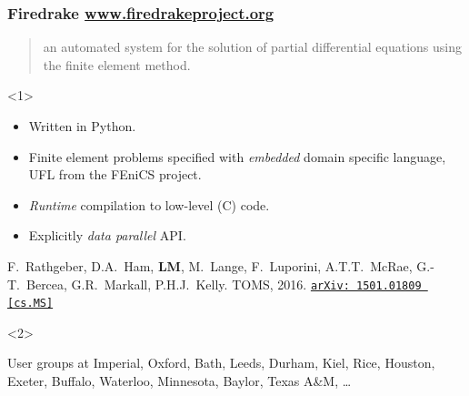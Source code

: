 \documentclass[presentation]{beamer}
\newcommand{\arxivlink}[2]{%
  \href{http://www.arxiv.org/abs/#1}%
  {\texttt{arXiv:\,#1\,[#2]}}%
}
\begin{document}
\begin{frame}
  \frametitle{Firedrake \url{www.firedrakeproject.org}}

  \begin{quote}
    {\normalfont [\ldots]} an automated system for the solution of partial
    differential equations using the finite element method.
  \end{quote}

  \begin{onlyenv}<1>
    \begin{itemize}
    \item Written in Python.
    \item Finite element problems specified with \emph{embedded}
      domain specific language, UFL \parencite{Alnaes:2014} from the
      FEniCS project.
    \item \emph{Runtime} compilation to low-level (C) code.
    \item Explicitly \emph{data parallel} API.
    \end{itemize}

    \begin{flushright}
      {\scriptsize F.~Rathgeber, D.A.~Ham, \textbf{LM}, M.~Lange,
        F.~Luporini, A.T.T.~McRae, G.-T.~Bercea, G.R.~Markall,
        P.H.J.~Kelly. TOMS,
        2016. \arxivlink{1501.01809}{cs.MS}\nocite{Rathgeber:2016}}
    \end{flushright}
  \end{onlyenv}
  \begin{onlyenv}<2>
    \begin{block}{User groups at}
      Imperial, Oxford, Bath, Leeds, Durham, Kiel, Rice, Houston, Exeter, Buffalo,
      Waterloo, Minnesota, Baylor, Texas A\&M, \dots
    \end{block}
  \end{onlyenv}
\end{frame}
\end{document}
